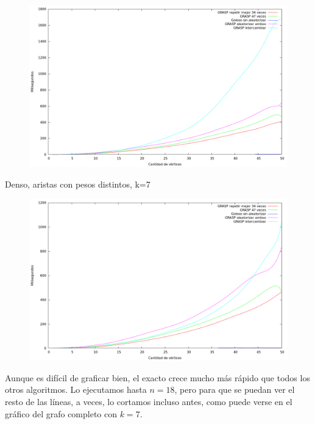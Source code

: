 \begin{figure}[H]
  \begin{center}
    \includegraphics[scale=0.35]{imagenes/ej6-denso-pesos-distintos-k3-tiempo.png}
  \end{center}
\end{figure}

Denso, aristas con pesos distintos, k=7

\begin{figure}[H]
  \begin{center}
    \includegraphics[scale=0.35]{imagenes/ej6-denso-pesos-distintos-k7-tiempo.png}
  \end{center}
\end{figure}

Aunque es difícil de graficar bien, el exacto crece mucho más rápido que todos
los otros algoritmos.  Lo ejecutamos hasta $n = 18$, pero para que se puedan
ver el resto de las líneas, a veces, lo cortamos incluso antes, como puede
verse en el gráfico del grafo completo con $k = 7$.

